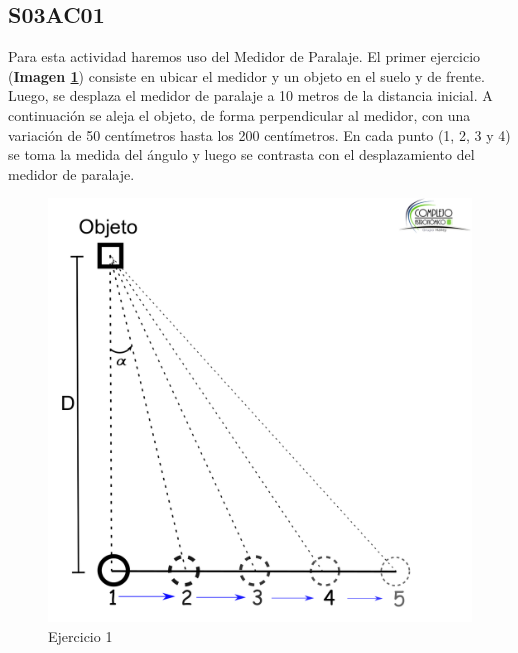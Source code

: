 \documentclass[10pt,a4paper]{article}
\begin{document}
\subsection{S03AC01}
Para esta actividad haremos uso del Medidor de Paralaje. El primer ejercicio (\textbf{Imagen \ref{paralaje_2}}) consiste en ubicar el medidor y un objeto en el suelo y de frente. Luego, se desplaza el medidor de paralaje a 10 metros de la distancia inicial. A continuación se aleja el objeto, de forma perpendicular al medidor, con una variación de 50 centímetros hasta los 200 centímetros. En cada punto (1, 2, 3 y 4) se toma la medida del ángulo y luego se contrasta con el desplazamiento del medidor de paralaje.

\begin{figure}[H]
\centering
\includegraphics[scale=0.18]{Imagenes/Paralaje_02}
\caption{Ejercicio 1}
\label{paralaje_2}
\end{figure}
\end{document}
